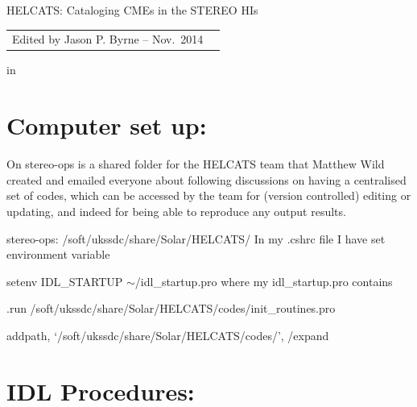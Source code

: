 \documentclass[12pt, a4paper, oneside]{article}
\begin{document}








\begin{center}
{\sc \Large HELCATS: Cataloging CMEs in the STEREO HIs}
\end{center}
 
 \begin{center}
\begin{tabular}{ll}
\large Edited by Jason P. Byrne -- Nov.~2014
\end{tabular}
 \end{center}

 in

 


\section{Computer set up:}

On stereo-ops is a shared folder for the HELCATS team that Matthew Wild created and emailed everyone about following discussions on having a centralised set of codes, which can be accessed by the team for (version controlled) editing or updating, and indeed for being able to reproduce any output results.

stereo-ops: /soft/ukssdc/share/Solar/HELCATS/
\newline
\newline
In my .cshrc file I have set environment variable

setenv IDL\_STARTUP $\sim$/idl\_startup.pro
\newline
where my idl\_startup.pro contains 

.run /soft/ukssdc/share/Solar/HELCATS/codes/init\_routines.pro

addpath, `/soft/ukssdc/share/Solar/HELCATS/codes/', /expand


\vskip 0.2in

\section{IDL Procedures:}
\end{document}
